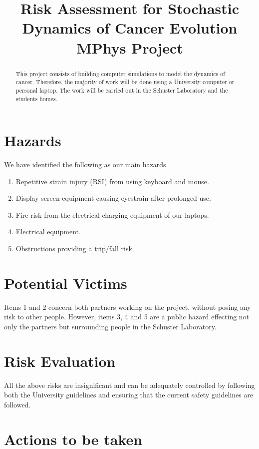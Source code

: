\documentclass[a4paper]{article}
\title{Risk Assessment for Stochastic Dynamics of Cancer Evolution MPhys Project}
\date{}
\begin{document}
\maketitle

\begin{abstract}
This project consists of building computer simulations to model the dynamics of cancer. Therefore, the majority of work will be done using a University computer or personal laptop. The work will be carried out in the Schuster Laboratory and the students homes. 
\end{abstract}

\section{Hazards}

We have identified the following as our main hazards. 

\begin{enumerate}
\item Repetitive strain injury (RSI) from using keyboard and mouse. 
\item Display screen equipment causing eyestrain after prolonged use.
\item Fire risk from the electrical charging equipment of our laptops. 
\item Electrical equipment. 
\item Obstructions providing a trip/fall risk.
\end{enumerate}

\section{Potential Victims}

Items 1 and 2 concern both partners working on the project, without posing any risk to other people. However, items 3, 4 and 5 are a public hazard effecting not only the partners but surrounding people in the Schuster Laboratory.  

\section{Risk Evaluation}

All the above risks are insignificant and can be adequately controlled by following both the University guidelines and ensuring that the current safety guidelines are followed. 

\section{Actions to be taken}
\end{document}

